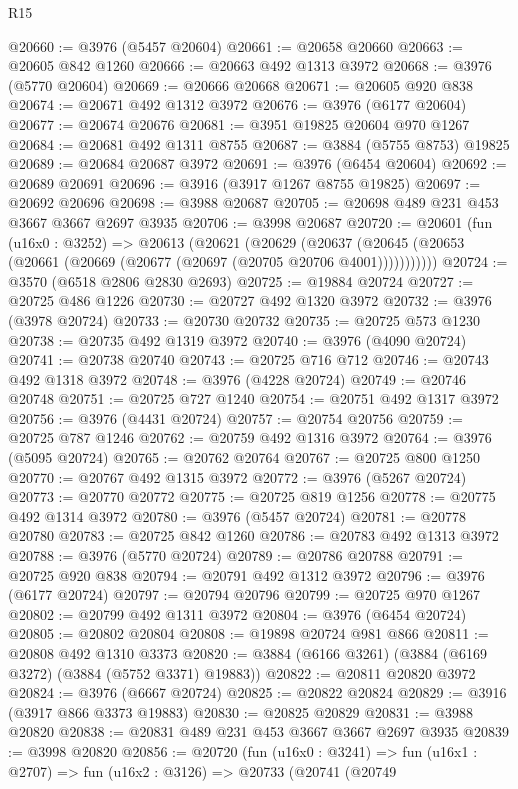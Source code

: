 \begin{lexlean}{R15}
\begin{coremodule}
@20660 := @3976 (@5457 @20604)
@20661 := @20658 @20660
@20663 := @20605 @842 @1260
@20666 := @20663 @492 @1313 @3972
@20668 := @3976 (@5770 @20604)
@20669 := @20666 @20668
@20671 := @20605 @920 @838
@20674 := @20671 @492 @1312 @3972
@20676 := @3976 (@6177 @20604)
@20677 := @20674 @20676
@20681 := @3951 @19825 @20604 @970 @1267
@20684 := @20681 @492 @1311 @8755
@20687 := @3884 (@5755 @8753) @19825
@20689 := @20684 @20687 @3972
@20691 := @3976 (@6454 @20604)
@20692 := @20689 @20691
@20696 := @3916 (@3917 @1267 @8755 @19825)
@20697 := @20692 @20696
@20698 := @3988 @20687
@20705 := @20698 @489 @231 @453 @3667 @3667 @2697 @3935
@20706 := @3998 @20687
@20720 := @20601
    (fun (u16x0 : @3252) =>
    @20613
      (@20621
        (@20629
          (@20637 (@20645 (@20653 (@20661 (@20669 (@20677 (@20697 (@20705 @20706 @4001)))))))))))
@20724 := @3570 (@6518 @2806 @2830 @2693)
@20725 := @19884 @20724
@20727 := @20725 @486 @1226
@20730 := @20727 @492 @1320 @3972
@20732 := @3976 (@3978 @20724)
@20733 := @20730 @20732
@20735 := @20725 @573 @1230
@20738 := @20735 @492 @1319 @3972
@20740 := @3976 (@4090 @20724)
@20741 := @20738 @20740
@20743 := @20725 @716 @712
@20746 := @20743 @492 @1318 @3972
@20748 := @3976 (@4228 @20724)
@20749 := @20746 @20748
@20751 := @20725 @727 @1240
@20754 := @20751 @492 @1317 @3972
@20756 := @3976 (@4431 @20724)
@20757 := @20754 @20756
@20759 := @20725 @787 @1246
@20762 := @20759 @492 @1316 @3972
@20764 := @3976 (@5095 @20724)
@20765 := @20762 @20764
@20767 := @20725 @800 @1250
@20770 := @20767 @492 @1315 @3972
@20772 := @3976 (@5267 @20724)
@20773 := @20770 @20772
@20775 := @20725 @819 @1256
@20778 := @20775 @492 @1314 @3972
@20780 := @3976 (@5457 @20724)
@20781 := @20778 @20780
@20783 := @20725 @842 @1260
@20786 := @20783 @492 @1313 @3972
@20788 := @3976 (@5770 @20724)
@20789 := @20786 @20788
@20791 := @20725 @920 @838
@20794 := @20791 @492 @1312 @3972
@20796 := @3976 (@6177 @20724)
@20797 := @20794 @20796
@20799 := @20725 @970 @1267
@20802 := @20799 @492 @1311 @3972
@20804 := @3976 (@6454 @20724)
@20805 := @20802 @20804
@20808 := @19898 @20724 @981 @866
@20811 := @20808 @492 @1310 @3373
@20820 := @3884 (@6166 @3261) (@3884 (@6169 @3272) (@3884 (@5752 @3371) @19883))
@20822 := @20811 @20820 @3972
@20824 := @3976 (@6667 @20724)
@20825 := @20822 @20824
@20829 := @3916 (@3917 @866 @3373 @19883)
@20830 := @20825 @20829
@20831 := @3988 @20820
@20838 := @20831 @489 @231 @453 @3667 @3667 @2697 @3935
@20839 := @3998 @20820
@20856 := @20720
    (fun (u16x0 : @3241) =>
    fun (u16x1 : @2707) =>
    fun (u16x2 : @3126) =>
    @20733
      (@20741
        (@20749

\end{coremodule}
\end{lexlean}
